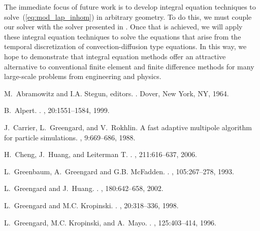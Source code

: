 \documentclass[preprint,12pt]{elsarticle}
\newcommand{\eqr}[1]{~(\ref{#1})}
\begin{document}
The immediate focus of future work is to develop integral equation techniques to solve\eqr{eq:mod_lap_inhom} in arbitrary geometry.  To do this, we must couple our solver with the solver presented in \cite{modified:helmholtz}. 
Once that is achieved, we will apply these integral equation techniques to solve the equations that arise from the temporal discretization of convection-diffusion type equations.
In this way, we hope to demonstrate that integral equation methods offer an attractive alternative to conventional finite element and finite difference methods for many large-scale problems from engineering and physics.


\begin{thebibliography}{10}

M.~Abramowitz and I.A. Stegun, editors.
.
\newblock Dover, New York, NY, 1964.

B.~Alpert.
.
, 20:1551--1584, 1999.

J.~Carrier, L.~Greengard, and V.~Rokhlin.
\newblock A fast adaptive multipole algorithm for particle simulations.
, 9:669--686, 1988.

H.~Cheng, J.~Huang, and Leiterman T.
.
, 211:616--637, 2006.

L.~Greenbaum, A.~Greengard and G.B. McFadden.
.
, 105:267--278, 1993.

L.~Greengard and J.~Huang.
.
, 180:642--658, 2002.

L.~Greengard and M.C. Kropinski.
.
, 20:318--336, 1998.

L.~Greengard, M.C. Kropinski, and A.~Mayo.
.
, 125:403--414, 1996.


\end{thebibliography}
\end{document}
